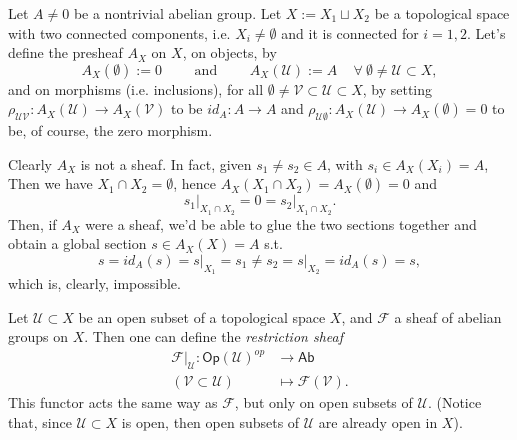 \documentclass[../Main]{subfiles}
\begin{document}
\begin{ex}[]
	Let $A \neq 0$ be a nontrivial abelian group.
	Let $X := X_1 \sqcup X_2$ be a topological space with two connected components,
	i.e. $X_i \neq \emptyset$ and it is connected for $i = 1,2$.
	Let's define the presheaf $A_X$ on $X$, on objects, by
	\begin{equation}
		A_X(\emptyset) := 0
		\qquad \text{ and } \qquad
		A_X(\mathcal{U}) := A \quad
		\,\forall\ \emptyset \neq \mathcal{U} \subset X
	,\end{equation} 
	and on morphisms (i.e. inclusions), for all $\emptyset \neq \mathcal{V} \subset \mathcal{U} \subset X$,
	by setting $\rho_{\mathcal{UV}}: A_X(\mathcal{U}) \to A_X(\mathcal{V})$
	to be $id_A\colon A \to A$
	and $\rho_{\mathcal{U}\emptyset}\colon A_X(\mathcal{U}) \to A_X(\emptyset) = 0$
	to be, of course, the zero morphism.

	Clearly $A_X$ is not a sheaf.
	In fact, given $s_1 \neq s_2 \in A$, with $s_i \in A_X(X_i) = A$,
	Then we have $X_1 \cap X_2 = \emptyset$, hence $A_X(X_1 \cap X_2) = A_X(\emptyset) = 0$
	and
	\begin{equation}
	\left.s_1\right|_{X_1 \cap X_2} = 0 = 
	\left.s_2\right|_{X_1 \cap X_2} 
	.\end{equation} 
	Then, if $A_X$ were a sheaf, we'd be able to glue the two sections together
	and obtain a global section $s \in A_X(X) = A$ s.t.
	\begin{equation}
		s = id_A(s) = \left.s\right|_{X_1} = s_1 \neq
		s_2 = \left.s\right|_{X_2} = id_A(s) = s
	,\end{equation}
	which is, clearly, impossible.
\end{ex}

\begin{defn}
	Let $\mathcal{U} \subset X$ be an open subset of a topological space $X$,
	and $\mathcal{F}$ a sheaf of abelian groups on $X$.
	Then one can define the {\em restriction sheaf}
	\begin{align}
		\left.\mathcal{F}\right|_{\mathcal{U}}: \mathsf{Op}(\mathcal{U})^{op} &\longrightarrow 
			\mathsf{Ab}\\
			\left( \mathcal{V} \subset \mathcal{U} \right) &\longmapsto 
			\mathcal{F}(\mathcal{V}) \nonumber
	.\end{align} 
	This functor acts the same way as $\mathcal{F}$, but only on open subsets of $\mathcal{U}$.
	(Notice that, since $\mathcal{U} \subset X$ is open, then open subsets of $\mathcal{U}$
	are already open in $X$).
\end{defn}
\end{document}
